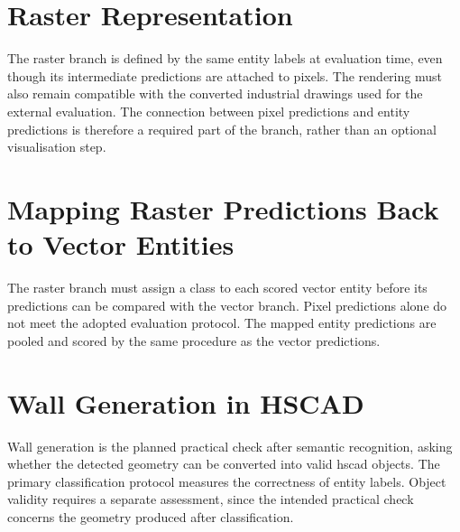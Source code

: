 
\section{Raster Representation}
\label{sec:raster-representation}
The raster branch is defined by the same entity labels at evaluation time, even
though its intermediate predictions are attached to pixels.
The rendering must also remain compatible with the converted industrial drawings
used for the external evaluation.
The connection between pixel predictions and entity predictions is therefore a
required part of the branch, rather than an optional visualisation step.


\section{Mapping Raster Predictions Back to Vector Entities}
\label{sec:raster-to-vector}
The raster branch must assign a class to each scored vector entity before its
predictions can be compared with the vector branch.
Pixel predictions alone do not meet the adopted evaluation protocol.
The mapped entity predictions are pooled and scored by the same procedure as the
vector predictions.


\section{Wall Generation in HSCAD}
\label{sec:wall-generation}
Wall generation is the planned practical check after semantic recognition, asking
whether the detected geometry can be converted into valid \gls{hscad} objects.
The primary classification protocol measures the correctness of entity labels.
Object validity requires a separate assessment, since the intended practical check
concerns the geometry produced after classification.

